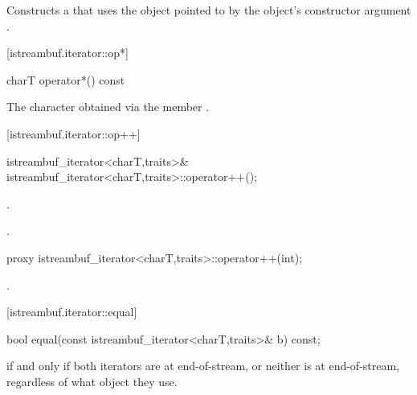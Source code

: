 \begin{itemdescr}
\pnum
\effects
Constructs a
that uses the
object pointed to by the
object's constructor argument .
\end{itemdescr}

[istreambuf.iterator::op*]{}

%
\begin{itemdecl}
charT operator*() const
\end{itemdecl}

\begin{itemdescr}
\pnum
\returns
The character obtained via the
member
.
\end{itemdescr}

[istreambuf.iterator::op++]{}

%
\begin{itemdecl}
istreambuf_iterator<charT,traits>&
    istreambuf_iterator<charT,traits>::operator++();
\end{itemdecl}

\begin{itemdescr}
\pnum
\effects
{}.

\pnum
\returns
{}.
\end{itemdescr}

%
%
\begin{itemdecl}
proxy istreambuf_iterator<charT,traits>::operator++(int);
\end{itemdecl}

\begin{itemdescr}
\pnum
\returns
{}.
\end{itemdescr}

[istreambuf.iterator::equal]{}

%
\begin{itemdecl}
bool equal(const istreambuf_iterator<charT,traits>& b) const;
\end{itemdecl}

\begin{itemdescr}
\pnum
\returns
{}
if and only if both iterators are at end-of-stream,
or neither is at end-of-stream, regardless of what
object they use.
\end{itemdescr}

